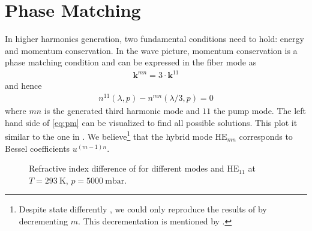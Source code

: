 \documentclass[fleqn, 10pt, twocolumn]{SelfArx}
\begin{document}
    \section{Phase Matching}
    In higher harmonics generation, two fundamental conditions need to hold: energy and momentum conservation. 
    In the wave picture, momentum conservation is a phase matching condition and can be expressed in the fiber mode as
    \begin{align}
        \mathbf{k}^{mn} = 3 \cdot \mathbf k^{11} 
    \end{align}
    and hence
    \begin{align}
        n^{11}(\lambda, p) - n^{mn}(\lambda / 3, p)= 0
        \label{eq:pm}
    \end{align}
    where $mn$ is the generated third harmonic mode and $11$ the pump mode. 
    The left hand side of \eqref{eq:pm} can be visualized to find all possible solutions. This plot it similar to the one in \cite{Nold2010}. 
    We believe\footnote{Despite \citeauthor{Travers2011} state differently \cite{Travers2011}, we could only reproduce the results of \citeauthor{Nold2010} by decrementing $m$. This decrementation is mentioned by \citeauthor{Marcatili1964} \cite{Marcatili1964}.} that the hybrid mode $\text{HE}_{mn}$ corresponds to Bessel coefficients $u^{(m-1)n}$.
    \begin{figure}[h]
        \centering
        \caption{Refractive index difference of  for different  modes and $\text{HE}_{11}$ at $T=\SI{293}{\kelvin}$, $p=\SI{5000}{\milli\bar}$.}
        \label{plt:pm}
    \end{figure}
\end{document}
